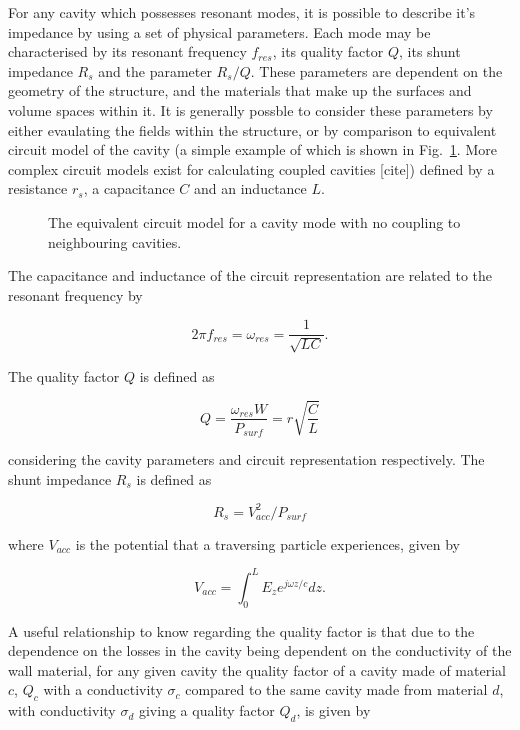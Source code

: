 \label{app:ferrProp}

For any cavity which possesses resonant modes, it is possible to describe it's impedance by using a set of physical parameters. Each mode may be characterised by its resonant frequency $f_{res}$, its quality factor $Q$, its shunt impedance $R_{s}$ and the parameter $R_{s}/Q$. These parameters are dependent on the geometry of the structure, and the materials that make up the surfaces and volume spaces within it. It is generally possble to consider these parameters by either evaulating the fields within the structure, or by comparison to equivalent circuit model of the cavity (a simple example of which is shown in Fig.~\ref{fig:cavCircuitModel}. More complex circuit models exist for calculating coupled cavities [cite]) defined by a resistance $r_{s}$, a capacitance $C$ and an inductance $L$.

\begin{figure}
\caption{The equivalent circuit model for a cavity mode with no coupling to neighbouring cavities.}
\label{fig:cavCircuitModel}
\end{figure}

The capacitance and inductance of the circuit representation are related to the resonant frequency by

\begin{equation}
2\pi f_{res} = \omega_{res} = \frac{1}{\sqrt{LC}}.
\end{equation}

The quality factor $Q$ is defined as

\begin{equation}
Q = \frac{\omega_{res}W}{P_{surf}} = r\sqrt{\frac{C}{L}}
\end{equation}

considering the cavity parameters and circuit representation respectively. The shunt impedance $R_{s}$ is defined as

\begin{equation}
R_{s} = V_{acc}^{2}/P_{surf}
\end{equation}

where $V_{acc}$ is the potential that a traversing particle experiences, given by

\begin{equation}
V_{acc} = \int^{L}_{0} E_{z} e^{j\omega z/c} dz.
\end{equation}

A useful relationship to know regarding the quality factor is that due to the dependence on the losses in the cavity being dependent on the conductivity of the wall material, for any given cavity the quality factor of a cavity made of material $c$, $Q_{c}$ with a conductivity $\sigma_{c}$ compared to the same cavity made from material $d$, with conductivity $\sigma_{d}$ giving a quality factor $Q_{d}$, is given by

